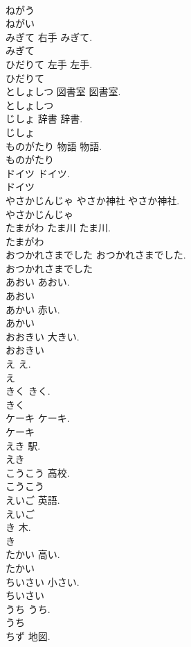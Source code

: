 \documentclass[8pt]{extreport}
\begin{document}
\begin{CJK}{UTF8}{min}
\\	ねがう
\\	ねがい
\\	みぎて	右手	みぎて.	
\\	みぎて
\\	ひだりて	左手	左手.	
\\	ひだりて
\\	としょしつ	図書室	図書室.	
\\	としょしつ
\\	じしょ	辞書	辞書.	
\\	じしょ
\\	ものがたり	物語	物語.	
\\	ものがたり
\\	ドイツ		ドイツ.	
\\	ドイツ
\\	やさかじんじゃ	やさか神社	やさか神社.	
\\	やさかじんじゃ
\\	たまがわ	たま川	たま川.	
\\	たまがわ
\\	おつかれさまでした		おつかれさまでした.	
\\	おつかれさまでした
\\	あおい		あおい.	
\\	あおい
\\	あかい		赤い.	
\\	あかい
\\	おおきい		大きい.	
\\	おおきい
\\	え		え.	
\\	え
\\	きく		きく.	
\\	きく
\\	ケーキ		ケーキ.	
\\	ケーキ
\\	えき		駅.	
\\	えき
\\	こうこう		高校.	
\\	こうこう
\\	えいご		英語.	
\\	えいご
\\	き		木.	
\\	き
\\	たかい		高い.	
\\	たかい
\\	ちいさい		小さい.	
\\	ちいさい
\\	うち		うち.	
\\	うち
\\	ちず		地図.	

\end{CJK}
\end{document}
